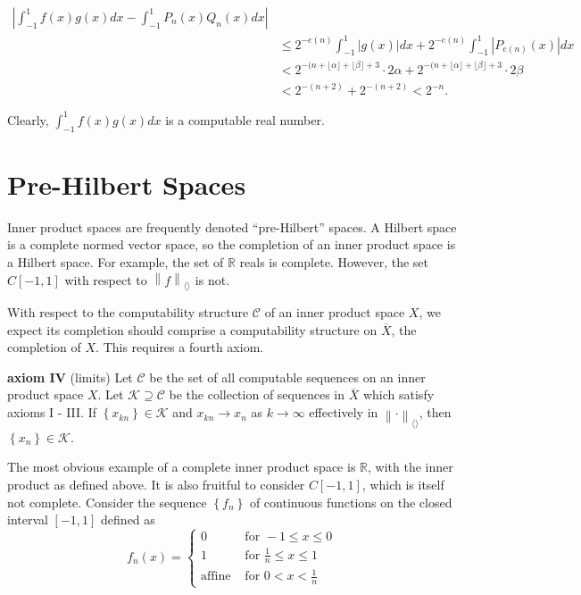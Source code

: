 \documentclass[a4paper,10pt]{article}
\begin{document}
\begin{align*}
\left|\int_{-1}^{1}f(x)g(x)dx - \int_{-1}^{1}P_{n}(x)Q_{n}(x)dx\right| \\
& \leq 2^{-e(n)} \int_{-1}^{1}\left|g(x)\right|dx + 2^{-e(n)} \int_{-1}^{1}\left|P_{e(n)}(x)\right|dx \\
& < 2^{-(n + \lfloor\alpha\rfloor + \lfloor\beta\rfloor + 3} \cdot 2\alpha + 2^{-(n + \lfloor\alpha\rfloor + \lfloor\beta\rfloor + 3} \cdot 2\beta \\
& < 2^{-(n + 2)} + 2^{-(n + 2)} < 2^{-n}.
\end{align*}

Clearly, $\displaystyle\int_{-1}^{1}f(x)g(x)dx$ is a computable real number.

\section{Pre-Hilbert Spaces}

Inner product spaces are frequently denoted ``pre-Hilbert'' spaces.  A Hilbert space is a complete normed vector space, so the completion of an inner product space is a Hilbert space.  For example, the set of $\mathbb{R}$ reals is complete.  However, the set $C\left[-1, 1\right]$ with respect to $\left\|f\right\|_{\langle\rangle}$ is not.

With respect to the computability structure $\mathscr{C}$ of an inner product space $X$, we expect its completion should comprise a computability structure on $\overline{X}$, the completion of $X$.  This requires a fourth axiom.

\begin{list}{}{}
 \item \textbf{axiom IV} (limits) Let $\mathscr{C}$ be the set of all computable sequences on an inner product space $X$.  Let $\mathscr{K}\supseteq\mathscr{C}$ be the collection of sequences in $\overline{X}$ which satisfy axioms I - III.  If $\left\{x_{kn}\right\} \in \mathscr{K}$ and $x_{kn} \to x_n$ as $k \to \infty$ effectively in $\left\|\cdot\right\|_{\langle\rangle}$, then $\left\{x_n\right\} \in \mathscr{K}$.
\end{list}

The most obvious example of a complete inner product space is $\mathbb{R}$, with the inner product as defined above.    It is also fruitful to consider $C\left[-1, 1\right]$, which is itself not complete.  Consider the sequence $\left\{f_n\right\}$ of continuous functions on the closed interval $\left[-1, 1\right]$ defined as
$$f_{n}(x) =
\left\{
    \begin{array}{ll}
	0 & \mbox{for } -1 \leq x \leq 0 \\
	1 & \mbox{for } \frac{1}{n} \leq x \leq 1 \\
	\mbox{affine } & \mbox{for } 0 < x < \frac{1}{n}
    \end{array}
\right.$$
\end{document}
